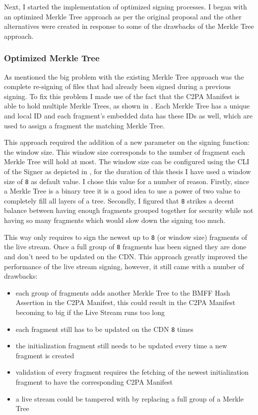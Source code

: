 Next, I started the implementation of optimized signing processes. I began with an optimized Merkle Tree approach as per the original proposal and the other alternatives were created in response to some of the drawbacks of the Merkle Tree approach.

\subsubsection{Optimized Merkle Tree}

As mentioned the big problem with the existing Merkle Tree approach was the complete re-signing of files that had already been signed during a previous signing. To fix this problem I made use of the fact that the C2PA Manifest is able to hold multiple Merkle Trees, as shown in . Each Merkle Tree has a unique and local ID and each fragment's embedded data has these IDs as well, which are used to assign a fragment the matching Merkle Tree.

This approach required the addition of a new parameter on the signing function: the window size. This window size corresponds to the number of fragment each Merkle Tree will hold at most. The window size can be configured using the CLI of the Signer as depicted in , for the duration of this thesis I have used a window size of \texttt{8} as default value. I chose this value for a number of reason. Firstly, since a Merkle Tree is a binary tree it is a good idea to use a power of two value to completely fill all layers of a tree. Secondly, I figured that \texttt{8} strikes a decent balance between having enough fragments grouped together for security while not having so many fragments which would slow down the signing too much.

This way only requires to sign the newest up to \texttt{8} (or window size) fragments of the live stream. Once a full group of \texttt{8} fragments has been signed they are done and don't need to be updated on the CDN. This approach greatly improved the performance of the live stream signing, however, it still came with a number of drawbacks:

\begin{itemize}
    \item each group of fragments adds another Merkle Tree to the BMFF Hash Assertion in the C2PA Manifest, this could result in the C2PA Manifest becoming to big if the Live Stream runs too long
    \item each fragment still has to be updated on the CDN \texttt{8} times
    \item the initialization fragment still needs to be updated every time a new fragment is created
    \item validation of every fragment requires the fetching of the newest initialization fragment to have the corresponding C2PA Manifest
    \item a live stream could be tampered with by replacing a full group of a Merkle Tree
\end{itemize}

